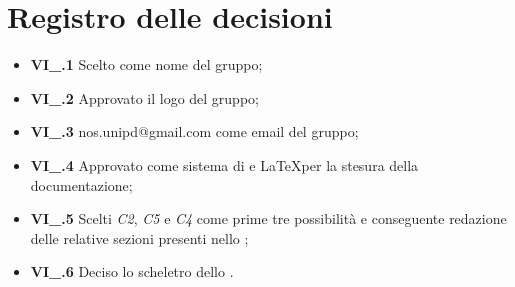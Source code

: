 \section{Registro delle decisioni}
\begin{itemize}
  \item \textbf{VI\_\Data.1} Scelto {\Gruppo} come nome del gruppo;
  \item \textbf{VI\_\Data.2} Approvato il logo del gruppo;
  \item \textbf{VI\_\Data.3} nos.unipd@gmail.com come email del gruppo;
  \item \textbf{VI\_\Data.4} Approvato  come sistema di  e \LaTeX per la stesura della documentazione;
  \item \textbf{VI\_\Data.5} Scelti  \textit{C2}, \textit{C5} e \textit{C4} come prime tre possibilità e conseguente redazione delle relative sezioni presenti nello \textit{\SdF};
  \item \textbf{VI\_\Data.6} Deciso lo scheletro dello \textit{\SdF}.

\end{itemize}




